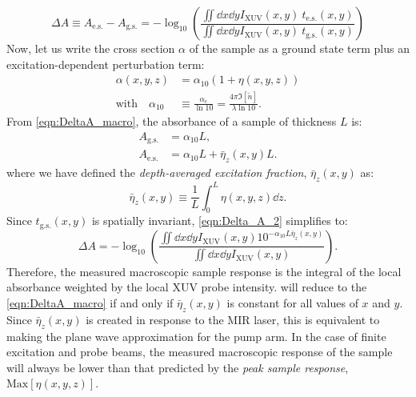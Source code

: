 \begin{equation}
\Delta A \equiv A_{\textrm{e.s.}} - A_{\textrm{g.s.}} = - \log_{10} \left( \frac{\iint \dd{x} \dd{y} I_{\textrm{XUV}}(x,y) \ t_{\textrm{e.s.}}(x,y)}{\iint \dd{x} \dd{y} I_{\textrm{XUV}}(x,y) \ t_{\textrm{g.s.}}(x,y)} \right)
\label{eqn:Delta_A_2}
\end{equation}
Now, let us write the cross section $\alpha$ of the sample as a ground state term plus an excitation-dependent perturbation term:
\begin{equation}
\begin{aligned}
\label{eqn:deltaA_perturbation}
\alpha(x,y,z) &= \alpha_{10} (1 + \eta(x,y,z)) \\
\textrm{with} \quad \alpha_{10} &\equiv \frac{\alpha_e}{\ln 10} = \frac{4 \pi \Im [\tilde{n}]}{\lambda \ln 10}.
\end{aligned}
\end{equation}
From \cref{eqn:DeltaA_macro}, the absorbance of a sample of thickness $L$ is:
\begin{equation}
\begin{aligned}
A_{\textrm{g.s.}} &= \alpha_{10} L, \\
A_{\textrm{e.s.}} &= \alpha_{10} L + \bar{\eta}_z(x,y) L.
\end{aligned}
\end{equation}
where we have defined the \textit{depth-averaged excitation fraction}, $\bar{\eta}_z(x,y)$ as:
\begin{equation}
\bar{\eta}_z(x,y) \equiv \frac{1}{L} \int_{0}^{L} \eta(x,y,z) \dd{z}.
\label{eqn:eta_z}
\end{equation}
Since $t_{\textrm{g.s.}}(x,y)$ is spatially invariant, \cref{eqn:Delta_A_2} simplifies to:
\begin{equation}
\Delta A = -\log_{10} \left( \frac{ \iint \dd{x} \dd{y} I_{\textrm{XUV}}(x,y) 10^{- \alpha_{10} L \bar{\eta}_z(x,y)}}{ \iint \dd{x} \dd{y} I_{\textrm{XUV}}(x,y)} \right).
\label{eqn:Delta_A_3}
\end{equation}
Therefore, the measured macroscopic sample response is the integral of the local absorbance weighted by the local XUV probe intensity.  will reduce to the \cref{eqn:DeltaA_macro} if and only if $\bar{\eta}_z(x,y)$ is constant for all values of $x$ and $y$. Since $\bar{\eta}_z(x,y)$ is created in response to the MIR laser, this is equivalent to making the plane wave approximation for the pump arm. In the case of finite excitation and probe beams, the measured macroscopic response of the sample will always be lower than that predicted by the \textit{peak sample response}, $\textrm{Max}[\eta(x,y,z)]$. 

